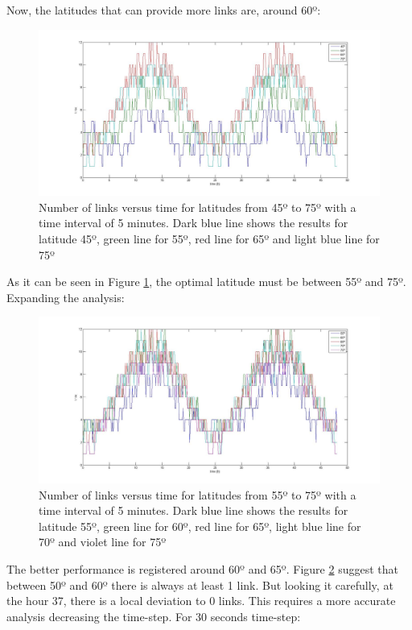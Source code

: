 Now, the latitudes that can provide more links are, around 60º:
\begin{figure}[H]
\begin{center}
\includegraphics[scale=0.30]{45_10_75_lat.jpg}
\caption[Links vs time for latitudes from 45º to 75º]{Number of links versus time for latitudes from 45º to 75º with a time interval of 5 minutes. Dark blue line shows the results for latitude 45º, green line for 55º, red line for 65º and light blue line for 75º}
\label{fig:lat4}
\end{center}
\end{figure}
As it can be seen in Figure \ref{fig:lat4}, the optimal latitude must be between 55º and 75º. Expanding the analysis:
\begin{figure}[H]
\begin{center}
\includegraphics[scale=0.30]{55_5_75_lat.jpg}
\caption[Links vs time for latitudes from 55º to 75º]{Number of links versus time for latitudes from 55º to 75º with a time interval of 5 minutes. Dark blue line shows the results for latitude 55º, green line for 60º, red line for 65º, light blue line for 70º and violet line for 75º}
\label{fig:lat5}
\end{center}
\end{figure}
The better performance is registered around 60º and 65º. Figure \ref{fig:lat5} suggest that between 50º and 60º there is always at least 1 link. But looking it carefully, at the hour 37, there is a local deviation to 0 links. This requires a more accurate analysis decreasing the time-step. For 30 seconds time-step:
